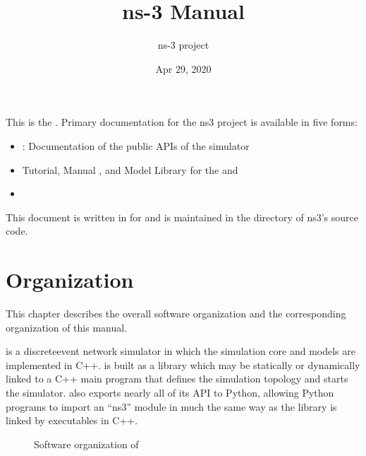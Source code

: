 \documentclass[letterpaper,10pt,english]{sphinxmanual}
\title{ns-3 Manual}
\date{Apr 29, 2020}
\author{ns-3 project}
\renewcommand{\sphinxcode}[1]{\texttt{\small{#1}}}
\begin{document}
\pagestyle{empty}
\sphinxmaketitle
\pagestyle{plain}
\sphinxtableofcontents
\pagestyle{normal}
\label{\detokenize{index::doc}}


This is the . Primary documentation for the ns\sphinxhyphen{}3 project is
available in five forms:
\begin{itemize}
\item {} 
: Documentation of the public APIs of the simulator

\item {} 
Tutorial, Manual , and Model Library for the  and 

\item {} 

\end{itemize}

This document is written in  for  and is maintained in the
\sphinxcode{} directory of ns\sphinxhyphen{}3’s source code.


\chapter{Organization}
\label{\detokenize{organization:organization}}\label{\detokenize{organization::doc}}
This chapter describes the overall  software organization and the
corresponding organization of this manual.

 is a discrete\sphinxhyphen{}event network simulator in which the simulation core
and models are implemented in C++.  is built as a library which may be
statically or dynamically linked to a C++ main program that defines the
simulation topology and starts the simulator.  also exports nearly all
of its API to Python, allowing Python programs to import an “ns3” module in
much the same way as the  library is linked by executables in C++.

\begin{figure}[htbp]
\centering
\capstart

\noindent{}
\caption{Software organization of }\label{\detokenize{organization:id1}}\label{\detokenize{organization:software-organization}}\end{figure}
\end{document}
